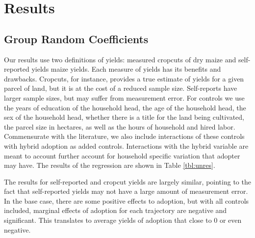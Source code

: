 \documentclass{article}
\begin{document}
\section{Results}

\subsection{Group Random Coefficients}

Our results use two definitions of yields: measured cropcuts of dry maize and self-reported yields maize yields. Each measure of yields has its benefits and drawbacks. Cropcuts, for instance, provides a true estimate of yields for a given parcel of land, but it is at the cost of a reduced sample size. Self-reports have larger sample sizes, but may suffer from measurement error. For controls we use the years of education of the household head, the age of the household head, the sex of the household head, whether there is a title for the land being cultivated, the parcel size in hectares, as well as the hours of household and hired labor. Commensurate with the literature, we also include interactions of these controls with hybrid adoption as added controls. Interactions with the hybrid variable are meant to account further account for household specific variation that adopter may have. The results of the regression are shown in Table \ref{tbl:unres}.

The results for self-reported and cropcut yields are largely similar, pointing to the fact that self-reported yields may not have a large amount of measurement error. In the base case, there are some positive effects to adoption, but with all controls included, marginal effects of adoption for each trajectory are negative and significant. This translates to average yields of adoption that close to 0 or even negative. 

\resizebox{1\textwidth}{!}{

}

\resizebox{1\textwidth}{!}{
\centering
% 


}
% 
\end{document}
